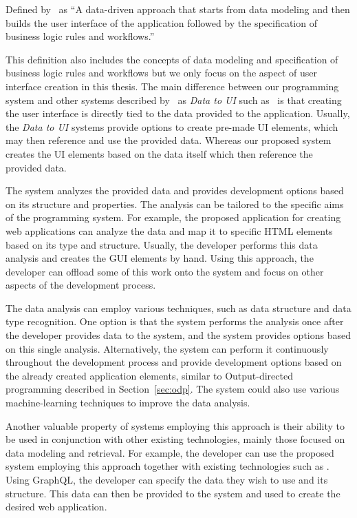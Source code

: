 \begin{defn}[Data to UI]
	Defined by~\citet{Sahay_Indamutsa_Di} as ``A data-driven approach that starts from data modeling and then builds the user interface of the application followed by the specification of business logic rules and workflows.''
\end{defn}

This definition also includes the concepts of data modeling and specification of business logic rules and workflows but we only focus on the aspect of user interface creation in this thesis.
The main difference between our programming system and other systems described by~\citet{Sahay_Indamutsa_Di} as \emph{Data to UI} such as~\citet{mendix} is that creating the user interface is directly tied to the data provided to the application.
Usually, the \emph{Data to UI} systems provide options to create pre-made UI elements, which may then reference and use the provided data.
Whereas our proposed system creates the UI elements based on the data itself which then reference the provided data.

The system analyzes the provided data and provides development options based on its structure and properties.
The analysis can be tailored to the specific aims of the programming system.
For example, the proposed application for creating web applications can analyze the data and map it to specific HTML elements based on its type and structure.
Usually, the developer performs this data analysis and creates the GUI elements by hand.
Using this approach, the developer can offload some of this work onto the system and focus on other aspects of the development process.

The data analysis can employ various techniques, such as data structure and data type recognition.
One option is that the system performs the analysis once after the developer provides data to the system, and the system provides options based on this single analysis.
Alternatively, the system can perform it continuously throughout the development process and provide development options based on the already created application elements, similar to Output-directed programming described in Section~\ref{sec:odp}.
The system could also use various machine-learning techniques to improve the data analysis.

Another valuable property of systems employing this approach is their ability to be used in conjunction with other existing technologies, mainly those focused on data modeling and retrieval.
For example, the developer can use the proposed system employing this approach together with existing technologies such as \citet{graphql}.
Using GraphQL, the developer can specify the data they wish to use and its structure.
This data can then be provided to the system and used to create the desired web application.




